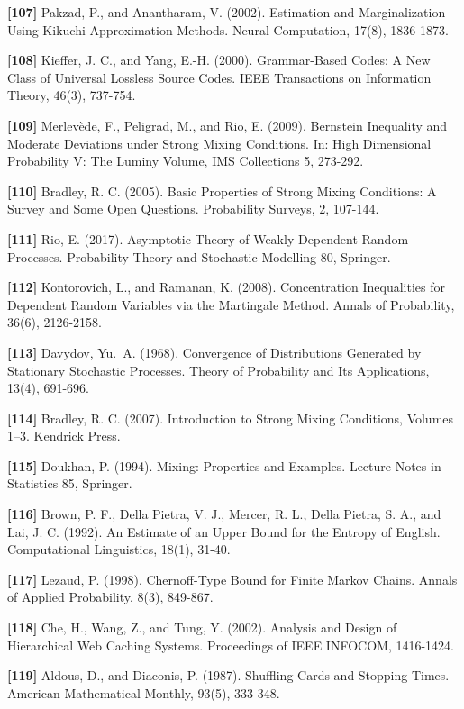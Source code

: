 \documentclass[
]{article}
\begin{document}
\textbf{{[}107{]}} Pakzad, P., and Anantharam, V. (2002). Estimation
and Marginalization Using Kikuchi Approximation Methods. Neural
Computation, 17(8), 1836-1873.

\textbf{{[}108{]}} Kieffer, J. C., and Yang, E.-H. (2000). Grammar-Based
Codes: A New Class of Universal Lossless Source Codes. IEEE Transactions
on Information Theory, 46(3), 737-754.

\textbf{{[}109{]}} Merlev\`ede, F., Peligrad, M., and Rio, E. (2009).
Bernstein Inequality and Moderate Deviations under Strong Mixing
Conditions. In: High Dimensional Probability V: The Luminy Volume,
IMS Collections 5, 273-292.

\textbf{{[}110{]}} Bradley, R. C. (2005). Basic Properties of Strong
Mixing Conditions: A Survey and Some Open Questions. Probability
Surveys, 2, 107-144.

\textbf{{[}111{]}} Rio, E. (2017). Asymptotic Theory of Weakly
Dependent Random Processes. Probability Theory and Stochastic
Modelling 80, Springer.

\textbf{{[}112{]}} Kontorovich, L., and Ramanan, K. (2008).
Concentration Inequalities for Dependent Random Variables via the
Martingale Method. Annals of Probability, 36(6), 2126-2158.

\textbf{{[}113{]}} Davydov, Yu.\ A. (1968). Convergence of
Distributions Generated by Stationary Stochastic Processes. Theory
of Probability and Its Applications, 13(4), 691-696.

\textbf{{[}114{]}} Bradley, R. C. (2007). Introduction to Strong
Mixing Conditions, Volumes 1--3. Kendrick Press.

\textbf{{[}115{]}} Doukhan, P. (1994). Mixing: Properties and
Examples. Lecture Notes in Statistics 85, Springer.

\textbf{{[}116{]}} Brown, P. F., Della Pietra, V. J., Mercer,
R. L., Della Pietra, S. A., and Lai, J. C. (1992). An Estimate of
an Upper Bound for the Entropy of English. Computational Linguistics,
18(1), 31-40.

\textbf{{[}117{]}} Lezaud, P. (1998). Chernoff-Type Bound for Finite
Markov Chains. Annals of Applied Probability, 8(3), 849-867.

\textbf{{[}118{]}} Che, H., Wang, Z., and Tung, Y. (2002). Analysis
and Design of Hierarchical Web Caching Systems. Proceedings of IEEE
INFOCOM, 1416-1424.

\textbf{{[}119{]}} Aldous, D., and Diaconis, P. (1987). Shuffling
Cards and Stopping Times. American Mathematical Monthly, 93(5),
333-348.
\end{document}
